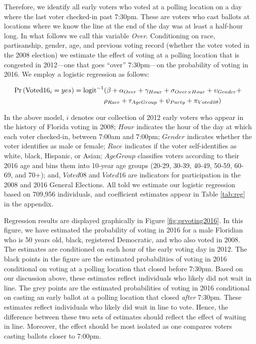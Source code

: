 \documentclass[12pt,titlepage]{article}
\begin{document}
Therefore, we identify all early voters who voted at a polling
location on a day where the last voter checked-in past 7:30pm.  These
are voters who cast ballots at locations where we know the line at the
end of the day was at least a half-hour long.  In what follows we call
this variable \emph{Over}.  Conditioning on race, partisanship,
gender, age, and previous voting record (whether the voter voted in
the 2008 election) we estimate the effect of voting at a polling
location that is congested in 2012---one that goes ``over''
7:30pm---on the probability of voting in 2016.  We employ a logistic
regression as follows:

\begin{equation*}
  \begin{aligned}
    \textup{Pr}\left(\mathrm{Voted16}_{i} = yes\right) =  \textup{logit}^{-1}&(\beta + \alpha_{Over} + \gamma_{Hour} +
    \sigma_{Over \times Hour} + \upsilon_{Gender}  + \\& \rho_{Race} +
      \tau_{Age Group} + \psi_{Party} + \pi_{Voted\emph{08}})
  \end{aligned}
\end{equation*}

In the above model, $i$ denotes our collection of 2012 early voters
who appear in the history of Florida voting in 2008; $Hour$ indicates
the hour of the day at which each voter checked-in, between 7:00am and
7:00pm; $Gender$ indicates whether the voter identifies as male or
female; $Race$ indicates if the voter self-identifies as white, black,
Hispanic, or Asian; $AgeGroup$ classifies voters according to their
2016 age and bins them into 10-year age groups (20-29, 30-39, 40-49,
50-59, 60-69, and 70+); and, $Voted08$ and $Voted16$ are indicators
for participation in the 2008 and 2016 General Elections.  All told we
estimate our logistic regression based on 709,956 individuals, and
coefficient estimates appear in Table \ref{tab:reg} in the appendix.

Regression results are displayed graphically in Figure
\ref{fig:prvoting2016}. In this figure, we have estimated the
probability of voting in 2016 for a male Floridian who is 50 years
old, black, registered Democratic, and who also voted in 2008.  The
estimates are conditioned on each hour of the early voting day in
2012. The black points in the figure are the estimated probabilities
of voting in 2016 conditional on voting at a polling location that
closed before 7:30pm.  Based on our discussion above, these estimates
reflect individuals who likely did not wait in line.  The grey points
are the estimated probabilities of voting in 2016 conditional on
casting an early ballot at a polling location that closed \emph{after}
7:30pm.  These estimates reflect individuals who likely did wait in
line to vote.  Hence, the difference between these two sets of
estimates should reflect the effect of waiting in line.  Moreover, the
effect should be most isolated as one compares voters casting ballots
closer to 7:00pm.
\end{document}
